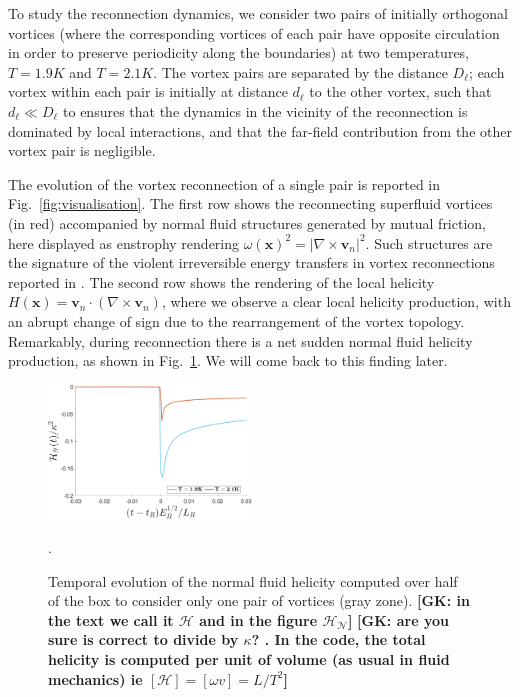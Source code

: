 \documentclass[%
 reprint,
 amsmath,amssymb,
 aps,
 prl,
]{revtex4-2}
\def \v{\mathbf{v}}
\def \x{\mathbf{x}}
\newcommand*{\NOTE}[1]{\textbf{\color{red}[#1]}}
\begin{document}
{To study the reconnection dynamics, we consider two pairs of initially orthogonal vortices (where the corresponding vortices of each pair have opposite circulation in order to preserve periodicity along the boundaries)
at two temperatures, $T=1.9K$ and $T=2.1K$. The vortex pairs are separated by the distance $D_{\ell}$; each vortex within each pair is initially at distance $d_{\ell}$ to the other vortex, such that $d_{\ell}\ll D_{\ell}$ to ensures that the dynamics in the vicinity of the reconnection is dominated by local interactions, and that the far-field contribution from the other vortex pair is negligible.

The evolution of the vortex reconnection of a single pair is reported in Fig.~\ref{fig:visualisation}. 
The first row shows the reconnecting superfluid vortices (in red) accompanied by normal fluid structures generated by mutual friction, here displayed as enstrophy rendering $\omega(\x)^2=|\nabla\times \v_n|^2$. Such structures are the signature of the violent irreversible energy transfers in vortex reconnections reported in \cite{stasiak2024quantum}. The second row shows the rendering of the local helicity $H(\x)=\v_n\cdot(\nabla\times \v_n )$, where we observe a clear local helicity production, with an abrupt change of sign due to the rearrangement of the vortex topology. Remarkably, during reconnection there is a net 
sudden normal fluid helicity production, as shown in Fig.~\ref{fig:total-helicity}. We will come back to this finding later.
\begin{figure}[t]
    \centering
    \includegraphics*[width=0.48\textwidth]{helicity_total}
\caption{Temporal evolution of the normal fluid helicity computed over half of the box to consider only one pair of vortices (gray zone). \NOTE{GK: in the text we call it $\mathcal{H}$ and in the figure $\mathcal{H}_\mathcal{N}$} \NOTE{GK: are you sure is correct to divide by $\kappa$? . In the code, the total helicity is computed per unit of volume (as usual in fluid mechanics) ie $[\mathcal{H}]=[\omega v]=L/T^2$}}.
\label{fig:total-helicity}
\end{figure}

}
\end{document}
